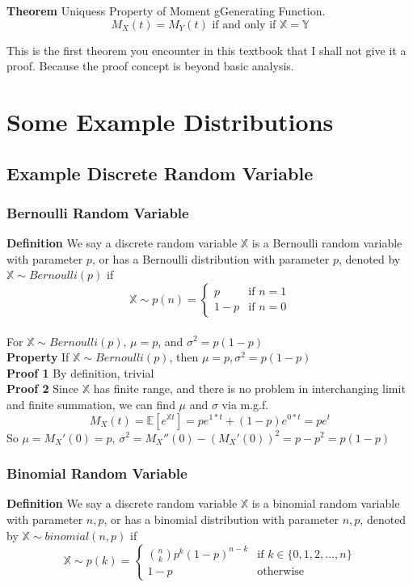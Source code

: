 \documentclass[a4paper,12pt]{article}
\begin{document}
\textbf{Theorem} Uniquess Property of Moment gGenerating Function.
$$M_X(t) = M_Y(t) \text{ if and only if } \mathbb{X}=\mathbb{Y}$$

This is the first theorem you encounter in this textbook that I shall not give it a proof. Because the proof concept is beyond basic analysis.


\newpage
\section{Some Example Distributions}
\subsection{Example Discrete Random Variable}
\subsubsection{Bernoulli Random Variable}
\textbf{Definition} We say a discrete random variable $\mathbb{X}$ is a Bernoulli random variable with parameter $p$, or has a Bernoulli distribution with parameter $p$, denoted by $\mathbb{X} \sim Bernoulli(p)$ if
$$
 \mathbb{X} \sim p(n) =
  \begin{cases}
   p & \text{if } n = 1 \\
   1-p       & \text{if } n = 0
  \end{cases}
$$\\

For $\mathbb{X} \sim Bernoulli(p)$, $\mu = p$, and $\sigma^2 = p(1-p)$\\

\textbf{Property} If $\mathbb{X} \sim Bernoulli(p)$, then $\mu = p, \sigma^2 = p(1-p)$\\

\textbf{Proof 1}
By definition, trivial\\

\textbf{Proof 2}
Since $\mathbb{X}$ has finite range, and there is no problem in interchanging limit and finite summation, we can find $\mu$ and $\sigma$ via m.g.f.
$$M_X(t) = \mathbb{E}[e^{\mathbb{X}t}] = pe^{1*t} + (1-p)e^{0*t} = pe^t$$
So $\mu = M_X'(0) = p$, $\sigma^2 = M_X''(0) - (M_X'(0))^2 = p-p^2 = p(1-p)$

\subsubsection{Binomial Random Variable}
\textbf{Definition} We say a discrete random variable $\mathbb{X}$ is a binomial random variable with parameter $n, p$, or has a binomial distribution with parameter $n, p$, denoted by $\mathbb{X} \sim binomial(n, p)$ if
$$
 \mathbb{X} \sim p(k) =
  \begin{cases}
   {n \choose k}p^k(1-p)^{n-k} & \text{if } k \in \{0, 1, 2, ..., n\} \\
   1-p       & \text{otherwise}
  \end{cases}
$$\\
\end{document}
